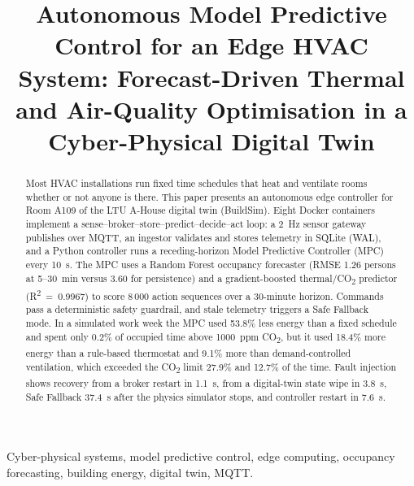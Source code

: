 \documentclass[conference,10pt]{IEEEtran}
\newcommand{\cotwo}{CO\textsubscript{2}}
\begin{document}
\title{Autonomous Model Predictive Control for an Edge HVAC System: Forecast-Driven Thermal and Air-Quality Optimisation in a Cyber-Physical Digital Twin}

\author{
}

\maketitle

\begin{abstract}
Most HVAC installations run fixed time schedules that heat and ventilate rooms whether or not anyone is there. This paper presents an autonomous edge controller for Room A109 of the LTU A-House digital twin (BuildSim). Eight Docker containers implement a sense--broker--store--predict--decide--act loop: a 2~Hz sensor gateway publishes over MQTT, an ingestor validates and stores telemetry in SQLite (WAL), and a Python controller runs a receding-horizon Model Predictive Controller (MPC) every 10~s. The MPC uses a Random Forest occupancy forecaster (RMSE 1.26 persons at 5--30~min versus 3.60 for persistence) and a gradient-boosted thermal/\cotwo{} predictor (R\textsuperscript{2}~=~0.9967) to score 8\,000 action sequences over a 30-minute horizon. Commands pass a deterministic safety guardrail, and stale telemetry triggers a Safe Fallback mode. In a simulated work week the MPC used 53.8\% less energy than a fixed schedule and spent only 0.2\% of occupied time above 1000~ppm \cotwo{}, but it used 18.4\% more energy than a rule-based thermostat and 9.1\% more than demand-controlled ventilation, which exceeded the \cotwo{} limit 27.9\% and 12.7\% of the time. Fault injection shows recovery from a broker restart in 1.1~s, from a digital-twin state wipe in 3.8~s, Safe Fallback 37.4~s after the physics simulator stops, and controller restart in 7.6~s.
\end{abstract}

\begin{IEEEkeywords}
Cyber-physical systems, model predictive control, edge computing, occupancy forecasting, building energy, digital twin, MQTT.
\end{IEEEkeywords}
\end{document}
